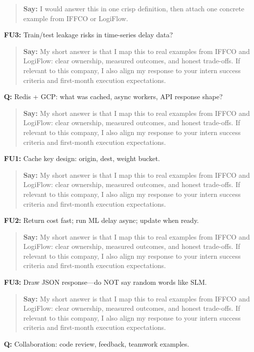 \documentclass[9pt,a4paper]{article}
\begin{document}
\begin{quote}\small\textbf{Say:} I would answer this in one crisp definition, then attach one concrete example from IFFCO or LogiFlow.\end{quote}
\vspace{2mm}
\textbf{FU3:} Train/test leakage risks in time-series delay data?

\begin{quote}\small\textbf{Say:} My short answer is that I map this to real examples from IFFCO and LogiFlow: clear ownership, measured outcomes, and honest trade-offs. If relevant to this company, I also align my response to your intern success criteria and first-month execution expectations.\end{quote}
\vspace{2mm}
\textbf{Q:} Redis + GCP: what was cached, async workers, API response shape?

\begin{quote}\small\textbf{Say:} My short answer is that I map this to real examples from IFFCO and LogiFlow: clear ownership, measured outcomes, and honest trade-offs. If relevant to this company, I also align my response to your intern success criteria and first-month execution expectations.\end{quote}
\vspace{2mm}
\textbf{FU1:} Cache key design: origin, dest, weight bucket.

\begin{quote}\small\textbf{Say:} My short answer is that I map this to real examples from IFFCO and LogiFlow: clear ownership, measured outcomes, and honest trade-offs. If relevant to this company, I also align my response to your intern success criteria and first-month execution expectations.\end{quote}
\vspace{2mm}
\textbf{FU2:} Return cost fast; run ML delay async; update when ready.

\begin{quote}\small\textbf{Say:} My short answer is that I map this to real examples from IFFCO and LogiFlow: clear ownership, measured outcomes, and honest trade-offs. If relevant to this company, I also align my response to your intern success criteria and first-month execution expectations.\end{quote}
\vspace{2mm}
\textbf{FU3:} Draw JSON response---do NOT say random words like SLM.

\begin{quote}\small\textbf{Say:} My short answer is that I map this to real examples from IFFCO and LogiFlow: clear ownership, measured outcomes, and honest trade-offs. If relevant to this company, I also align my response to your intern success criteria and first-month execution expectations.\end{quote}
\vspace{2mm}
\textbf{Q:} Collaboration: code review, feedback, teamwork examples.
\end{document}
